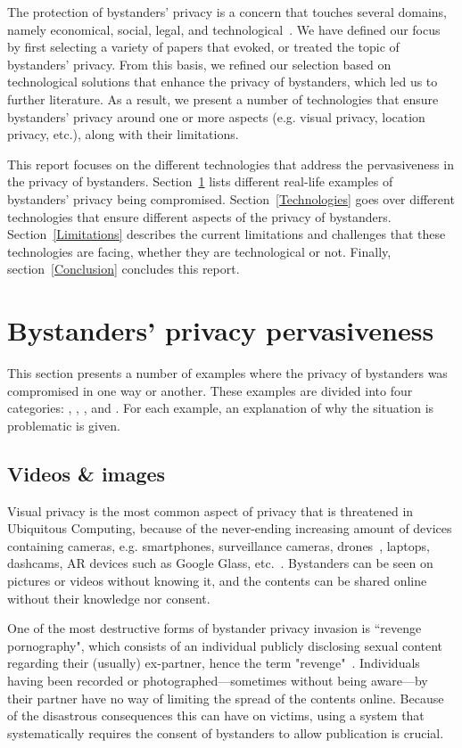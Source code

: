 \documentclass[conference]{IEEEtran}
\begin{document}
The protection of bystanders' privacy is a concern that touches several domains, namely economical, social, legal, and technological~\cite{lu2017privacy}. We have defined our focus by first selecting a variety of papers that evoked, or treated the topic of bystanders' privacy. From this basis, we refined our selection based on technological solutions that enhance the privacy of bystanders, which led us to further literature. As a result, we present a number of technologies that ensure bystanders' privacy around one or more aspects (e.g. visual privacy, location privacy, etc.), along with their limitations.

This report focuses on the different technologies that address the pervasiveness in the privacy of bystanders. Section~\ref{BystandersPrivacy} lists different real-life examples of bystanders' privacy being compromised. Section~\ref{Technologies} goes over different technologies that ensure different aspects of the privacy of bystanders. Section~\ref{Limitations} describes the current limitations and challenges that these technologies are facing, whether they are technological or not. Finally, section~\ref{Conclusion} concludes this report.

\section{Bystanders’ privacy pervasiveness}\label{BystandersPrivacy}
This section presents a number of examples where the privacy of bystanders was compromised in one way or another. These examples are divided into four categories: , , , and . For each example, an explanation of why the situation is problematic is given.

\subsection{Videos \& images}\label{Videos}
Visual privacy is the most common aspect of privacy that is threatened in Ubiquitous Computing, because of the never-ending increasing amount of devices containing cameras, e.g. smartphones, surveillance cameras, drones~\cite{yao2017privacy}, laptops, dashcams, \ac{AR} devices such as Google Glass, etc.~\cite{lu2017privacy, yao2017privacy, chinomi2008PriSurv}. Bystanders can be seen on pictures or videos without knowing it, and the contents can be shared online without their knowledge nor consent. 

One of the most destructive forms of bystander privacy invasion is ``revenge pornography", which consists of an individual publicly disclosing sexual content regarding their (usually) ex-partner, hence the term "revenge"~\cite{olteanu2018consensual}. Individuals having been recorded or photographed---sometimes without being aware---by their partner have no way of limiting the spread of the contents online. Because of the disastrous consequences this can have on victims, using a system that systematically requires the consent of bystanders to allow publication is crucial.
\end{document}

